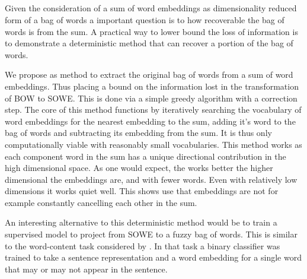 \documentclass{book}
\begin{document}





\subsection{ }
Given the consideration of a sum of word embeddings as dimensionality reduced form of a bag of words
a important question is to how recoverable the bag of words is from the sum.
A practical way to lower bound the loss of information
is to demonstrate a deterministic method that can recover a portion of the bag of words.


We propose as method to extract the original bag of words from a sum of word embeddings. Thus placing a bound on the information lost in the transformation of BOW to SOWE. This is done via a simple greedy algorithm with a correction step.
The core of this method functions by iteratively searching the vocabulary of word embeddings for the nearest embedding to the sum,
adding it's word to the bag of words and subtracting its embedding from the sum.
It is thus only computationally viable with reasonably small vocabularies.
This method works as each component word in the sum has a unique directional contribution in the high dimensional space.
As one would expect, the works better the higher dimensional the embeddings are, and with fewer words.
Even with relatively low dimensions it works quiet well.
This shows use that embeddings are not for example constantly cancelling each other in the sum.





An interesting alternative to this deterministic method would be to train a supervised model to project from SOWE to a fuzzy bag of words.
This is similar to the word-content task considered by
\citet{adi2017Probing}.
In that task a binary classifier was trained to take a sentence representation and a word embedding for a single word that may or may not appear in the sentence.
\end{document}
